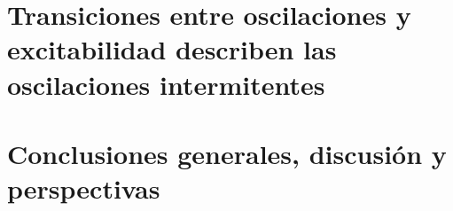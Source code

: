 \documentclass[graybox,envcountchap,sectrefs]{svmono}
\begin{document}
%


\chapter{Transiciones entre oscilaciones y excitabilidad describen las oscilaciones intermitentes}
\label{ch7}


\chapter{Conclusiones generales, discusión y perspectivas}

\label{ch8}

\appendix
{}




\backmatter%

\cleardoublepage
{}
\printbibliography
\end{document}
